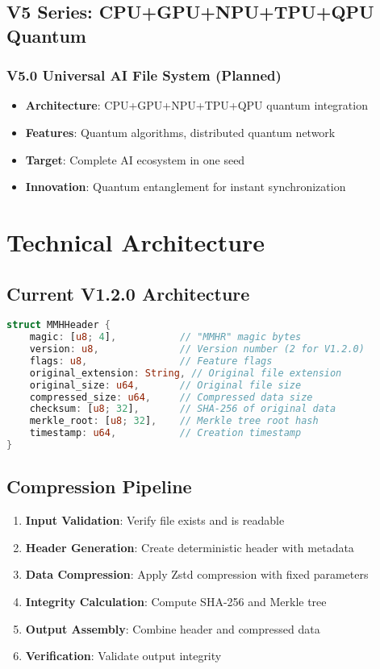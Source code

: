 \documentclass[12pt,a4paper]{article}
\begin{document}
\subsection{V5 Series: CPU+GPU+NPU+TPU+QPU Quantum}
\subsubsection{V5.0 Universal AI File System (Planned)}
\begin{itemize}
    \item \textbf{Architecture}: CPU+GPU+NPU+TPU+QPU quantum integration
    \item \textbf{Features}: Quantum algorithms, distributed quantum network
    \item \textbf{Target}: Complete AI ecosystem in one seed
    \item \textbf{Innovation}: Quantum entanglement for instant synchronization
\end{itemize}

\newpage

\section{Technical Architecture}

\subsection{Current V1.2.0 Architecture}
\begin{lstlisting}[language=Rust, caption=Core File Format Structure]
struct MMHHeader {
    magic: [u8; 4],           // "MMHR" magic bytes
    version: u8,              // Version number (2 for V1.2.0)
    flags: u8,                // Feature flags
    original_extension: String, // Original file extension
    original_size: u64,       // Original file size
    compressed_size: u64,     // Compressed data size
    checksum: [u8; 32],       // SHA-256 of original data
    merkle_root: [u8; 32],    // Merkle tree root hash
    timestamp: u64,           // Creation timestamp
}
\end{lstlisting}

\subsection{Compression Pipeline}
\begin{enumerate}
    \item \textbf{Input Validation}: Verify file exists and is readable
    \item \textbf{Header Generation}: Create deterministic header with metadata
    \item \textbf{Data Compression}: Apply Zstd compression with fixed parameters
    \item \textbf{Integrity Calculation}: Compute SHA-256 and Merkle tree
    \item \textbf{Output Assembly}: Combine header and compressed data
    \item \textbf{Verification}: Validate output integrity
\end{enumerate}
\end{document}
